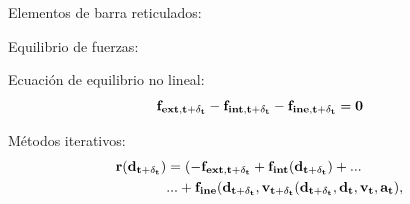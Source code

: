\documentclass[
  aspectratio=169,
]{beamer}
\begin{document}
\begin{small}
\begin{frame}{Elementos de barra reticulados:}{}
	
\end{frame}
\begin{frame}{Equilibrio de fuerzas:}{}
	\begin{block}{Ecuación de equilibrio no lineal:}
		\begin{equation}\label{Eq:MET:EquilibrioExacto}
				\bf{f}_{ext,t+\delta_t}-\bf{f}_{int,t+\delta_t}-\bf{f}_{ine,t+\delta_t}=0
		\end{equation}
	\end{block}
\vfill
\begin{block}{Métodos iterativos:}
	\begin{equation}\label{Eq:MET:Resto}
		\begin{split}
			\bf{r}(\bf{d}_{t+\delta_t})&=(-\bf{f}_{ext,t+\delta_t}+\bf{f}_{int}(\bf{d}_{t+\delta_t})+...\\	
			&...+\bf{f}_{ine}(\bf{d_{t+\delta_t}},\bf{v}_{t+\delta_t}(d_{t+\delta_t},\bf{d_t},\bf{v_t},\bf{a_t}),

\end{split}
\end{equation}
\end{block}
\end{frame}
\end{small}
\end{document}
